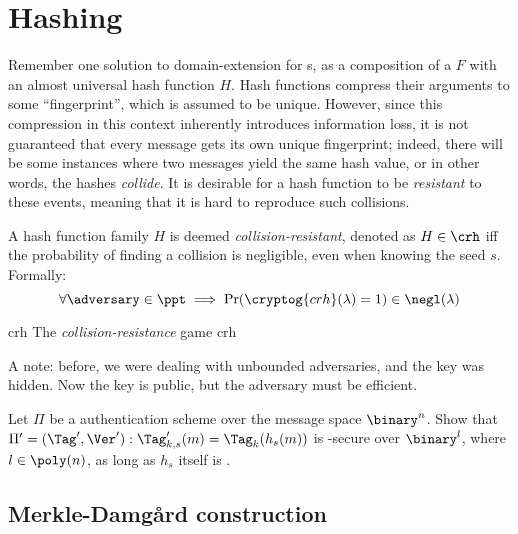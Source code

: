 \section{Hashing}

Remember one solution to domain-extension for \prf{}s, as a composition of a \prf{} $F$ with an almost universal hash function $H$. Hash functions compress their arguments to some ``fingerprint'', which is assumed to be unique. However, since this compression in this context inherently introduces information loss, it is not guaranteed that every message gets its own unique fingerprint; indeed, there will be some instances where two messages yield the same hash value, or in other words, the hashes \emph{collide}. It is desirable for a hash function to be \emph{resistant} to these events, meaning that it is hard to reproduce such collisions.

\begin{definition}
    A hash function family $H$ is deemed \emph{collision-resistant}, denoted as $H \in \crh$ iff the probability of finding a collision is negligible, even when knowing the seed $s$. Formally:
    \[
        \forall \adversary \in \ppt \implies \Pr(\cryptog{crh}(\lambda) = 1) \in \negl(\lambda)
    \]

    \begin{cryptogame}
        {crh}
        {The \emph{collision-resistance} game}
        {crh}


        
    \end{cryptogame}
\end{definition}

A note: before, we were dealing with unbounded adversaries, and the key was hidden. Now the key is public, but the adversary must be efficient.

\begin{exercise}
    Let $\Pi$ be a \ufcma{} authentication scheme over the message space $\binary^n$. Show that $\Pi' = (\Tag', \Ver') : \Tag'_{k, s}(m) = \Tag_k(h_s(m))$ is \ufcma-secure over $\binary^l$, where $l \in \poly(n)$, as long as $h_s$ itself is \crh.
\end{exercise}

\subsection{Merkle-Damg\r{a}rd construction}

